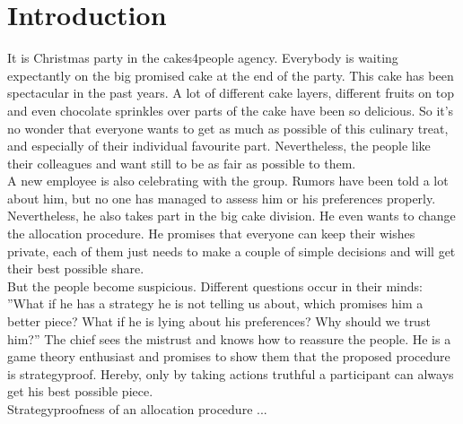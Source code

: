 \section{Introduction}
It is Christmas party in the cakes4people agency. Everybody is waiting expectantly on the big promised cake at the end of the party. This cake has been spectacular in the past years. A lot of different cake layers, different fruits on top and even chocolate sprinkles over parts of the cake have been so delicious. So it's no wonder that everyone wants to get as much as possible of this culinary treat, and especially of their individual favourite part. Nevertheless, the people like their colleagues and want still to be as fair as possible to them.\\A new employee is also celebrating with the group. Rumors have been told a lot about him, but no one has managed to assess him or his preferences properly. Nevertheless, he also takes part in the big cake division. He even wants to change the allocation procedure. He promises that everyone can keep their wishes private, each of them just needs to make a couple of simple decisions and will get their best possible share.\\But the people become suspicious. Different questions occur in their minds: ''What if he has a strategy he is not telling us about, which promises him a better piece? What if he is lying about his preferences? Why should we trust him?''
The chief sees the mistrust and knows how to reassure the people. He is a game theory enthusiast and promises to show them that the proposed procedure is strategyproof. Hereby, only by taking actions truthful a participant can always get his best possible piece.\\
Strategyproofness of an allocation procedure ...
